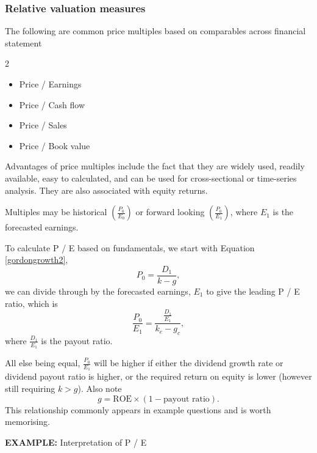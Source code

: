 \documentclass[../notes_compiled.tex]{subfiles}
\begin{document}
\subsubsection{Relative valuation measures}
\begin{itemize}
\item The following are common price multiples based on comparables across financial statement
\begin{multicols}{2}
\begin{itemize}
\item Price / Earnings
\item Price / Cash flow
\item Price / Sales
\item Price / Book value
\end{itemize}
\end{multicols}
\item Advantages of price multiples include the fact that they are widely used, readily available, easy to calculated, and can be used for cross-sectional or time-series analysis. They are also associated with equity returns.
\item Multiples may be historical $\left( \frac{P_{0}}{E_{0}}\right)$ or forward looking $\left( \frac{P_{0}}{E_{1}}\right)$, where $E_{1}$ is the forecasted earnings.
\item To calculate P / E based on fundamentals, we start with Equation \ref{gordongrowth2},
\begin{equation*}
P_{0}=\frac{D_{1}}{k-g},
\end{equation*}
we can divide through by the forecasted earnings, $E_{1}$ to give the leading P / E ratio, which is
\begin{equation}
\frac{P_{0}}{E_{1}}=\frac{\frac{D_{1}}{E_{1}}}{k_{e}-g_{c}},
\end{equation}
where $\frac{D_{1}}{E_{1}}$ is the payout ratio.
\item All else being equal, $\frac{P_{0}}{E_{1}}$ will be higher if either the dividend growth rate or dividend payout ratio is higher, or the required return on equity is lower (however still requiring $k>g$). Also note
\begin{equation}
g=\text{ROE}\times(1-\text{payout ratio}).
\end{equation}
This relationship commonly appears in example questions and is worth memorising.

{\color{RedViolet}
\item[] \textbf{EXAMPLE:} Interpretation of P / E

}
\end{itemize}
\end{document}
